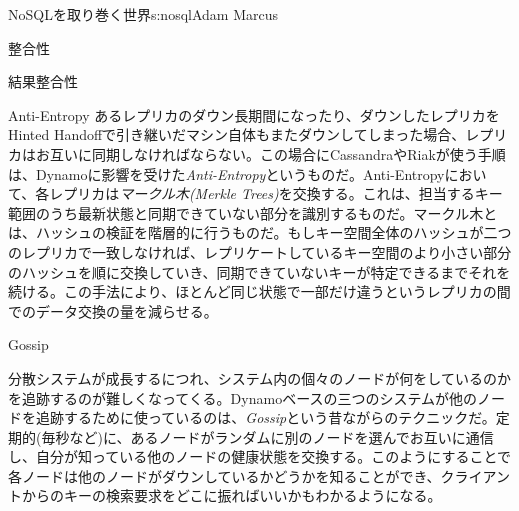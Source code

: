 \begin{aosachapter}{NoSQLを取り巻く世界}{s:nosql}{Adam Marcus}
\begin{aosasect1}{整合性}
\begin{aosasect2}{結果整合性}
\begin{aosasect3}{Anti-Entropy}
あるレプリカのダウン長期間になったり、ダウンしたレプリカをHinted Handoffで引き継いだマシン自体もまたダウンしてしまった場合、レプリカはお互いに同期しなければならない。この場合にCassandraやRiakが使う手順は、Dynamoに影響を受けた\emph{Anti-Entropy}というものだ。Anti-Entropyにおいて、各レプリカは\emph{マークル木(Merkle Trees)}を交換する。これは、担当するキー範囲のうち最新状態と同期できていない部分を識別するものだ。マークル木とは、ハッシュの検証を階層的に行うものだ。もしキー空間全体のハッシュが二つのレプリカで一致しなければ、レプリケートしているキー空間のより小さい部分のハッシュを順に交換していき、同期できていないキーが特定できるまでそれを続ける。この手法により、ほとんど同じ状態で一部だけ違うというレプリカの間でのデータ交換の量を減らせる。

\end{aosasect3}

\begin{aosasect3}{Gossip}

分散システムが成長するにつれ、システム内の個々のノードが何をしているのかを追跡するのが難しくなってくる。Dynamoベースの三つのシステムが他のノードを追跡するために使っているのは、\emph{Gossip}という昔ながらのテクニックだ。定期的(毎秒など)に、あるノードがランダムに別のノードを選んでお互いに通信し、自分が知っている他のノードの健康状態を交換する。このようにすることで各ノードは他のノードがダウンしているかどうかを知ることができ、クライアントからのキーの検索要求をどこに振ればいいかもわかるようになる。


\end{aosasect3}
\end{aosasect2}
\end{aosasect1}
\end{aosachapter}
